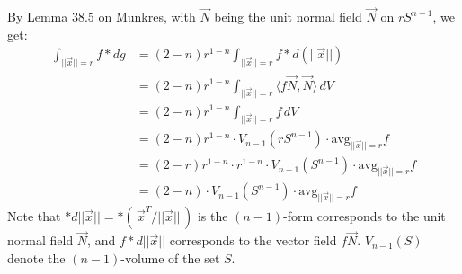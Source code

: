 \documentclass[15pt]{book}
\theoremstyle{break}
\theoremstyle{break}
\begin{document}
By Lemma 38.5 on Munkres, with $\vec{N}$ being the unit normal field $\vec{N}$ on $rS^{n-1}$, we get:
\begin{align*}
\int_{||\vec{x}|| = r} f*dg &= (2-n) r^{1-n}\int_{||\vec{x}|| = r}f*d(||\vec{x}||)\\
&= (2-n)r^{1-n}\int_{||\vec{x}|| = r}\langle f\vec{N},\vec{N}\rangle\, dV \\
&= (2-n)r^{1-n}\int_{||\vec{x}|| = r}f\, dV\\
&= (2-n)r^{1-n} \cdot V_{n-1}(r S^{n-1}) \cdot \text{avg}_{||\vec{x}|| = r}f \\
&= (2-r)r^{1-n}\cdot r^{1-n}\cdot V_{n-1}(S^{n-1}) \cdot \text{avg}_{||\vec{x}|| = r}f\\
&= (2-n)\cdot V_{n-1}(S^{n-1}) \cdot \text{avg}_{||\vec{x}|| = r}f
\end{align*}
Note that $*d||\vec{x}|| =*(\, \vec{x}^T/||\vec{x}||\,)$ is the $(n-1)$-form corresponds to the unit normal field $\vec{N}$, and $f*d||\vec{x}||$ corresponds to the vector field $f\vec{N}$. $V_{n-1}(S)$ denote the $(n-1)$-volume of the set $S$. \\
\end{document}
